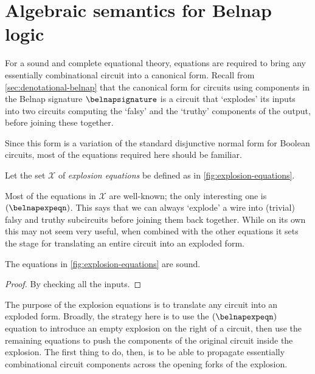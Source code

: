 \section{Algebraic semantics for Belnap logic}\label{sec:algebraic-belnap}

For a sound and complete equational theory, equations are required to bring any
essentially combinational circuit into a canonical form.
Recall from \cref{sec:denotational-belnap} that the canonical form for circuits
using components in the Belnap signature \(\belnapsignature\) is a circuit that
`explodes' its inputs into two circuits computing the `falsy' and the `truthy'
components of the output, before joining these together.

Since this form is a variation of the standard disjunctive normal form for
Boolean circuits, most of the equations required here should be familiar.

\begin{definition}
    Let the set \(\mathcal{X}\) of \emph{explosion equations} be defined as
    in \cref{fig:explosion-equations}.
\end{definition}



Most of the equations in \(\mathcal{X}\) are well-known; the only interesting
one is \((\belnapexpeqn)\).
This says that we can always `explode' a wire into (trivial) falsy and truthy
subcircuits before joining them back together.
While on its own this may not seem very useful, when combined with the other
equations it sets the stage for translating an entire circuit into an exploded
form.

\begin{lemma}
    The equations in \cref{fig:explosion-equations} are sound.
\end{lemma}
\begin{proof}
    By checking all the inputs.
\end{proof}

The purpose of the explosion equations is to translate any circuit into an
exploded form.
Broadly, the strategy here is to use the \((\belnapexpeqn)\) equation to
introduce an empty explosion on the right of a circuit, then use the remaining
equations to push the components of the original circuit inside the explosion.
The first thing to do, then, is to be able to propagate essentially
combinational circuit components across the opening forks of the explosion.

